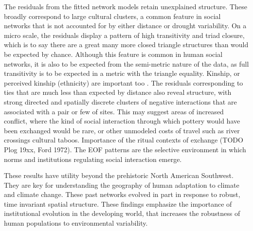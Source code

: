 \documentclass[10pt]{iopart}
\begin{document}

The residuals from the fitted network models retain unexplained structure. These broadly correspond to large cultural clusters, a common feature in social networks that is not accounted for by either distance or drought variability. On a micro scale, the residuals display a pattern of high transitivity and triad closure, which is to say there are a great many more closed triangle structures than would be expected by chance. Although this feature is common in human social networks, it is also to be expected from the semi-metric nature of the data, as full transitivity is to be expected in a metric with the triangle equality. Kinship, or perceived kinship (ethnicity) are important too \parencite{Nolin2010}. The residuals corresponding to ties that are much less than expected by distance also reveal structure, with strong directed and spatially discrete clusters of negative interactions that are associated with a pair or few of sites. This may suggest areas of increased conflict, where the kind of social interaction through which pottery would have been exchanged would be rare, or other unmodeled costs of travel such as river crossings cultural taboos. Importance of the ritual contexts of exchange (TODO Plog 19xx, Ford 1972). The EOF patterns are the selective environment in which norms and institutions regulating social interaction emerge. 

These results have utility beyond the prehistoric North American Southwest. They are key for understanding the geography of human adaptation to climate and climate change. These past networks evolved in part in response to robust, time invariant spatial structure. These findings emphasize the importance of institutional evolution in the developing world, that increases the robustness of human populations to environmental variability.

\printbibliography
\end{document}
